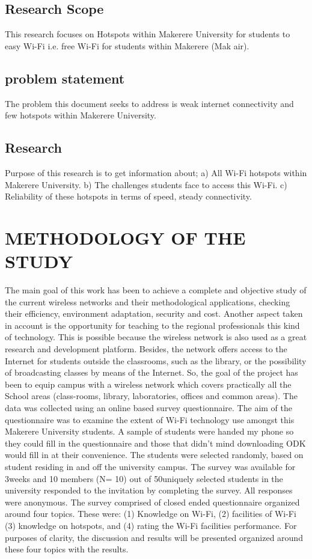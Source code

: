 ﻿\documentclass[10]{article}
\begin{document}
\subsection{Research Scope}
This research focuses on Hotspots within Makerere University for students to easy Wi-Fi i.e. free Wi-Fi for students within Makerere (Mak air).

\subsection{problem statement}
The problem this document seeks to address is weak internet connectivity and few hotspots within Makerere University.

\subsection{Research }
Purpose of this research is to get information about;
a)	All Wi-Fi hotspots within Makerere University.
b)	The challenges students face to access this Wi-Fi.
c)	Reliability of these hotspots in terms of speed, steady connectivity.

\section{METHODOLOGY OF THE STUDY}

The main goal of this work has been to achieve a complete and objective study of the current wireless networks and their methodological applications, checking their efficiency, environment adaptation, security and cost. 
Another aspect taken in account is the opportunity for teaching to the regional professionals this kind of technology. This is possible because the wireless network is also used as a great research and development platform. Besides, the network offers access to the Internet for students outside the classrooms, such as the library, or the possibility of broadcasting classes by means of the Internet.
So, the goal of the project has been to equip campus with a wireless network which covers practically all the School areas (class-rooms, library, laboratories, offices and common areas).
The data was collected using an online based survey questionnaire. The aim of the questionnaire was to examine the extent of Wi-Fi technology use amongst this Makerere University students.  A sample of students were handed my phone so they could fill in the questionnaire and those that didn’t mind downloading ODK would fill in at their convenience. The students were selected randomly, based on student residing in and off the university campus. The survey was available for 3weeks and 10 members (N= 10) out of 50{uniquely selected} students in the university responded to the invitation by completing the survey. All responses were anonymous. 
The survey comprised of closed ended questionnaire organized around four topics. These were: (1) Knowledge on Wi-Fi, (2) facilities of Wi-Fi (3) knowledge on hotspots, and (4) rating the Wi-Fi facilities performance. For purposes of clarity, the discussion and results will be presented organized around these four topics with the results. 
\end{document}
